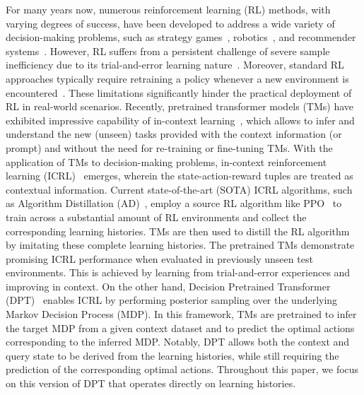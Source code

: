 \documentclass{article}
\begin{document}
For many years now, numerous reinforcement learning (RL) methods, with varying degrees of success, have been developed to address a wide variety of decision-making problems, such as strategy games~\citep{mnih2013playing, mnih2015human}, robotics~\citep{levine2016end, duan2016benchmarking}, and recommender systems~\citep{afsar2022reinforcement, lin2023survey}.
%
However, RL suffers from a persistent challenge of severe sample inefficiency due to its trial-and-error learning nature~\cite{sutton2018reinforcement}. Moreover, standard RL approaches typically require retraining a policy whenever a new environment is encountered~\cite{beck2023survey}. These limitations significantly hinder the practical deployment of RL in real-world scenarios.
%
Recently, pretrained transformer models (TMs) have exhibited impressive capability of in-context learning~\citep{dong2022survey, li2023transformers, wei2023larger, wies2024learnability}, which allows to infer and understand the new (unseen) tasks provided with the context information (or prompt) and without the need for re-training or fine-tuning TMs.
%
With the application of TMs to decision-making problems, in-context reinforcement learning (ICRL)~\citep{laskin2022context, lin2023transformers, sinii2023context, zisman2023emergence, lee2024supervised} emerges, wherein the state-action-reward tuples are treated as contextual information.
%
Current state-of-the-art (SOTA) ICRL algorithms, such as Algorithm Distillation (AD)~\cite{laskin2022context}, employ a source RL algorithm like PPO~\cite{schulman2017proximal} to train across a substantial amount of RL environments and collect the corresponding learning histories. TMs are then used to distill the RL algorithm by imitating these complete learning histories. The pretrained TMs demonstrate promising ICRL performance when evaluated in previously unseen test environments. This is achieved by learning from trial-and-error experiences and improving in context. 
%
On the other hand, Decision Pretrained Transformer (DPT)~\cite{lee2024supervised} enables ICRL by performing posterior sampling over the underlying Markov Decision Process (MDP). In this framework, TMs are pretrained to infer the target MDP from a given context dataset and to predict the optimal actions corresponding to the inferred MDP. Notably, DPT allows both the context and query state to be derived from the learning histories, while still requiring the prediction of the corresponding optimal actions. Throughout this paper, we focus on this version of DPT that operates directly on learning histories.
\end{document}
